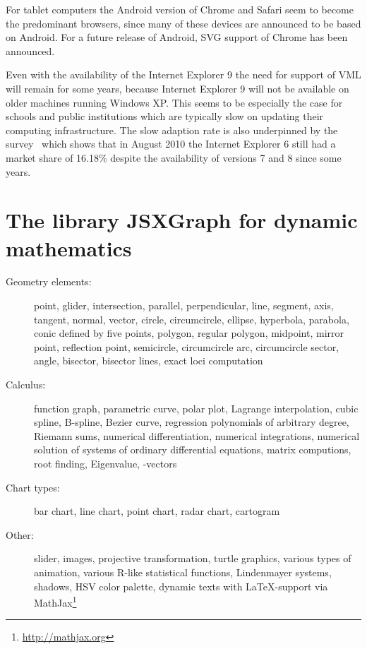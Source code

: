 \documentclass[12pt,a4paper]{article}%
\begin{document}
For tablet computers the Android version of Chrome and Safari seem to become the
predominant browsers, since many of these devices are announced to be based on Android.
For a future release of Android, SVG support of Chrome has been announced.

Even with the availability of the Internet Explorer 9 the need for support of
VML will remain for some years, because Internet Explorer 9 will not be available 
on older machines running Windows XP.
This seems to be especially the case for schools and public institutions which are
typically slow on updating their computing infrastructure. 
The slow adaption rate is also underpinned by the survey~\cite{netapplications} which
shows that in August 2010 the Internet Explorer 6 still had a market share of 16.18\%
despite the availability of versions 7 and 8 since some years.


\section{The library JSXGraph for dynamic mathematics}



\begin{description}
\item[Geometry elements:]
point, glider, intersection, parallel, perpendicular,
line, segment, axis, tangent, normal, vector,
circle, circumcircle, ellipse, hyperbola, parabola, conic defined by five points,
polygon, regular polygon, 
midpoint, mirror point, reflection point, 
semicircle, circumcircle arc, circumcircle sector,
angle, bisector, bisector lines,
exact loci computation
\item[Calculus:]
function graph, parametric curve, polar plot, 
Lagrange interpolation, cubic spline, B-spline, Bezier curve,
regression polynomials of arbitrary degree, 
Riemann sums, 
numerical differentiation, numerical integrations,
numerical solution of systems of ordinary differential equations,
matrix computions, root finding,
Eigenvalue, -vectors
\item[Chart types:]
bar chart, line chart, point chart, radar chart, cartogram
\item[Other:]
slider, images, 
projective transformation, turtle graphics, various types of animation,
various R-like statistical functions, 
Lindenmayer systems, shadows, HSV color palette, 
dynamic texts with \LaTeX{}-support via MathJax\footnote{\href{http://mathjax.org}{http://mathjax.org}}
\end{description}
\end{document}
